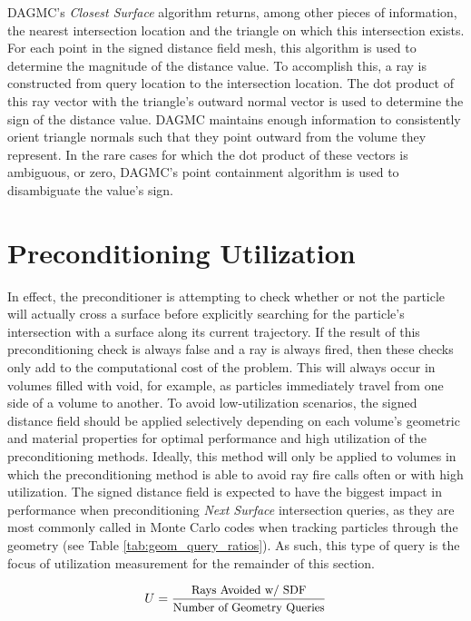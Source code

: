 DAGMC's \textit{Closest Surface} algorithm returns, among other pieces of
information, the nearest intersection location and the triangle on which this
intersection exists. For each point in the signed distance field mesh, this
algorithm is used to determine the magnitude of the distance value. To
accomplish this, a ray is constructed from query location to the intersection
location. The dot product of this ray vector with the triangle's outward normal
vector is used to determine the sign of the distance value. DAGMC maintains
enough information to consistently orient triangle normals such that they point
outward from the volume they represent. In the rare cases for which the dot
product of these vectors is ambiguous, or zero, DAGMC's point containment
algorithm is used to disambiguate the value's sign.

\section{Preconditioning Utilization}\label{sec:preconditioner_utilization}

In effect, the preconditioner is attempting to check whether or not the particle
will actually cross a surface before explicitly searching for the particle's
intersection with a surface along its current trajectory. If the result of this
preconditioning check is always false and a ray is always fired, then these
checks only add to the computational cost of the problem. This will
always occur in volumes filled with void, for example, as particles immediately
travel from one side of a volume to another. To avoid low-utilization scenarios,
the signed distance field should be applied selectively depending on each
volume's geometric and material properties for optimal performance and high
utilization of the preconditioning methods. Ideally, this method will only be
applied to volumes in which the preconditioning method is able to avoid ray fire
calls often or with high utilization. The signed distance field is expected to
have the biggest impact in performance when preconditioning \textit{Next Surface}
intersection queries, as they are most commonly called in Monte Carlo codes when
tracking  particles through the geometry (see Table
\ref{tab:geom_query_ratios}). As such, this type of query is the focus of
utilization measurement for the remainder of this section.


\begin{equation}
  U = \frac{ \small \text{Rays Avoided w/ SDF} }{ \small \text{Number of Geometry Queries} } 
   \label{eq:preconditioner_utilization}
\end{equation}

